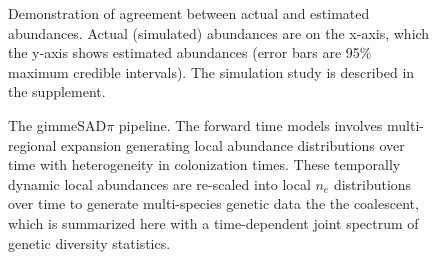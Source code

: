 \documentclass[12pt]{article}
\begin{document}
\begin{figure}[!hbp]
  \centering
  \caption{Demonstration of agreement between actual and estimated
    abundances. Actual (simulated) abundances are on the x-axis, which
    the y-axis shows estimated abundances (error bars are 95\% maximum
    credible intervals). The simulation study is described in the
    supplement.}
  \label{fig:abundEst}
\end{figure}

\begin{figure}[!hbp]
  \centering
  \caption{The gimmeSAD$\pi$ pipeline. The forward time models
    involves multi-regional expansion generating local abundance
    distributions over time with heterogeneity in
    colonization times. These temporally dynamic local abundances are
    re-scaled into local $n_e$ distributions over time to generate
    multi-species genetic data the the coalescent, which is summarized
    here with a time-dependent joint spectrum of genetic diversity
    statistics.}
  \label{fig:gimmeSAD}
\end{figure}
\end{document}
